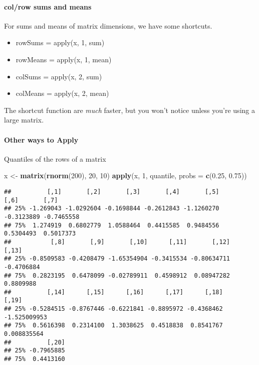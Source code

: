 \documentclass[
]{article}
\newenvironment{Shaded}{\begin{snugshade}}{\end{snugshade}}
\newcommand{\DataTypeTok}[1]{\textcolor[rgb]{0.13,0.29,0.53}{#1}}
\newcommand{\DecValTok}[1]{\textcolor[rgb]{0.00,0.00,0.81}{#1}}
\newcommand{\FloatTok}[1]{\textcolor[rgb]{0.00,0.00,0.81}{#1}}
\newcommand{\KeywordTok}[1]{\textcolor[rgb]{0.13,0.29,0.53}{\textbf{#1}}}
\newcommand{\NormalTok}[1]{#1}
\newcommand{\StringTok}[1]{\textcolor[rgb]{0.31,0.60,0.02}{#1}}
\begin{document}
\hypertarget{colrow-sums-and-means}{%
\paragraph{col/row sums and means}\label{colrow-sums-and-means}}

For sums and means of matrix dimensions, we have some shortcuts.

\begin{itemize}
\item
  rowSums = apply(x, 1, sum)
\item
  rowMeans = apply(x, 1, mean)
\item
  colSums = apply(x, 2, sum)
\item
  colMeans = apply(x, 2, mean)
\end{itemize}

The shortcut function are \emph{much} faster, but you won't notice
unless you're using a large matrix.

\hypertarget{other-ways-to-apply}{%
\paragraph{Other ways to Apply}\label{other-ways-to-apply}}

Quantiles of the rows of a matrix

\begin{Shaded}
\begin{Highlighting}[]
\NormalTok{x \textless{}{-}}\StringTok{ }\KeywordTok{matrix}\NormalTok{(}\KeywordTok{rnorm}\NormalTok{(}\DecValTok{200}\NormalTok{), }\DecValTok{20}\NormalTok{, }\DecValTok{10}\NormalTok{)}
\KeywordTok{apply}\NormalTok{(x, }\DecValTok{1}\NormalTok{, quantile, }\DataTypeTok{probs =} \KeywordTok{c}\NormalTok{(}\FloatTok{0.25}\NormalTok{, }\FloatTok{0.75}\NormalTok{))}
\end{Highlighting}
\end{Shaded}

\begin{verbatim}
##          [,1]       [,2]       [,3]       [,4]       [,5]       [,6]       [,7]
## 25% -1.269043 -1.0292604 -0.1698844 -0.2612843 -1.1260270 -0.3123889 -0.7465558
## 75%  1.274919  0.6802779  1.0588464  0.4415585  0.9484556  0.5304493  0.5017373
##           [,8]       [,9]       [,10]      [,11]       [,12]      [,13]
## 25% -0.8509583 -0.4208479 -1.65354904 -0.3415534 -0.80634711 -0.4706884
## 75%  0.2823195  0.6478099 -0.02789911  0.4598912  0.08947282  0.8809988
##          [,14]      [,15]      [,16]      [,17]      [,18]        [,19]
## 25% -0.5284515 -0.8767446 -0.6221841 -0.8895972 -0.4368462 -1.525009953
## 75%  0.5616398  0.2314100  1.3038625  0.4518838  0.8541767  0.008835564
##          [,20]
## 25% -0.7965885
## 75%  0.4413160
\end{verbatim}
\end{document}
